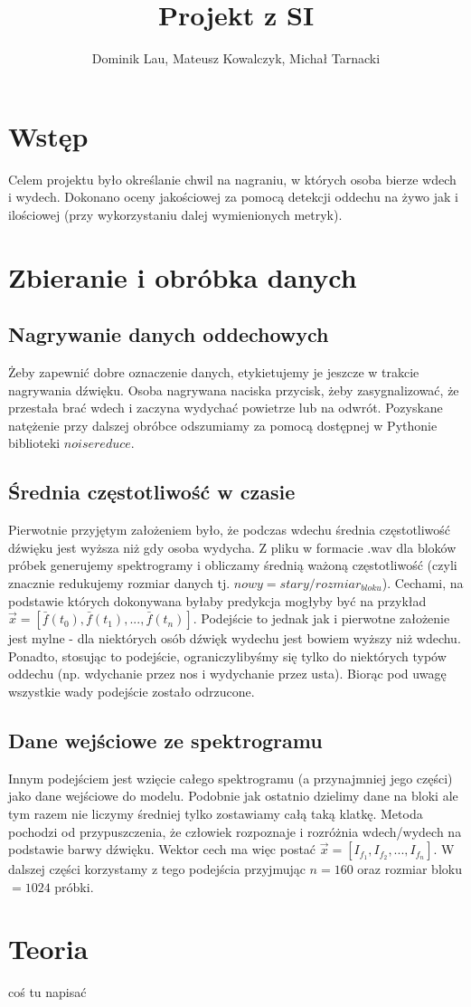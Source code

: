 \documentclass{article}
\title{Projekt z SI}
\author{Dominik Lau, Mateusz Kowalczyk, Michał Tarnacki}
\begin{document}
\maketitle

\section{Wstęp}
Celem projektu było określanie chwil na nagraniu, w których osoba bierze wdech i wydech. 
Dokonano oceny jakościowej za pomocą detekcji oddechu na żywo jak i ilościowej (przy wykorzystaniu
dalej wymienionych metryk).
\section{Zbieranie i obróbka danych}
\subsection{Nagrywanie danych oddechowych}
Żeby zapewnić dobre oznaczenie danych, etykietujemy je jeszcze w trakcie nagrywania dźwięku. 
Osoba nagrywana naciska przycisk, żeby zasygnalizować, że przestała brać wdech i zaczyna wydychać 
powietrze lub na odwrót. Pozyskane natężenie przy dalszej obróbce odszumiamy za pomocą dostępnej
w Pythonie biblioteki $noisereduce$.

\subsection{Średnia częstotliwość w czasie}
Pierwotnie przyjętym założeniem było, że podczas wdechu średnia częstotliwość dźwięku jest wyższa niż
gdy osoba wydycha. Z pliku w formacie .wav dla bloków próbek generujemy spektrogramy i obliczamy
średnią ważoną częstotliwość (czyli znacznie redukujemy rozmiar danych tj. $nowy = stary/rozmiar_{bloku}$).
Cechami, na podstawie których
dokonywana byłaby predykcja mogłyby być na przykład $\vec{x} = [\bar{f}(t_0), \bar{f}(t_1), ..., \bar{f}(t_n)]$.
Podejście to jednak jak i pierwotne założenie jest mylne - dla niektórych osób 
dźwięk wydechu jest bowiem wyższy
niż wdechu. Ponadto, stosując to podejście, ograniczylibyśmy się tylko do niektórych typów oddechu (np. 
wdychanie przez nos i wydychanie przez usta).  Biorąc pod uwagę wszystkie wady podejście zostało odrzucone.
\subsection{Dane wejściowe ze spektrogramu}
Innym podejściem jest wzięcie całego spektrogramu (a przynajmniej jego części) jako dane wejściowe do 
modelu.  Podobnie jak ostatnio dzielimy dane na bloki ale tym razem nie liczymy średniej tylko zostawiamy
całą taką klatkę.
Metoda pochodzi od przypuszczenia, że człowiek rozpoznaje i rozróżnia wdech/wydech
na podstawie barwy dźwięku.  Wektor cech ma więc postać $\vec{x} = [I_{f_1}, I_{f_2}, ..., I_{f_n}]$.
W dalszej części korzystamy z tego podejścia przyjmując $n=160$ oraz rozmiar bloku $=1024$ próbki.
\section{Teoria}
coś tu napisać
\end{document}
